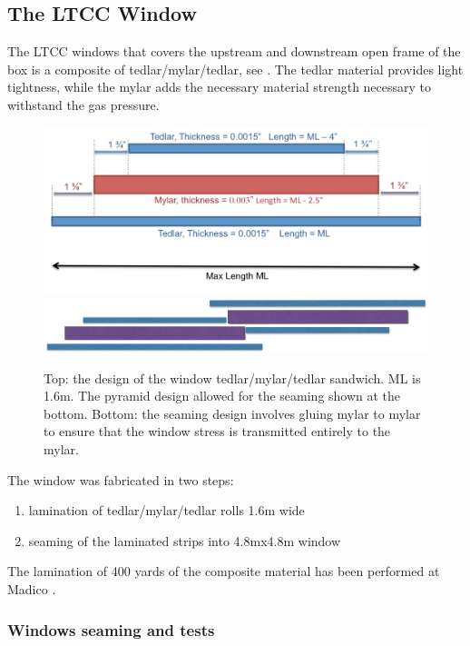 \subsection{The LTCC Window}

The LTCC windows that covers the upstream and downstream open frame of the box is a composite of tedlar/mylar/tedlar, see . The tedlar
material provides light tightness, while the mylar adds the necessary material strength necessary to withstand the gas pressure.

\begin{figure}
	\centering
	\includegraphics[width=1.0\columnwidth,keepaspectratio]{img/windowDesign.png}
	\includegraphics[width=1.0\columnwidth,keepaspectratio]{img/windowSeaming.png}
\caption{Top: the design of the window tedlar/mylar/tedlar sandwich. ML is 1.6m. The pyramid design allowed for the seaming shown at the bottom.
			Bottom: the seaming design involves gluing mylar to mylar to ensure that the window stress is transmitted entirely to the mylar. }
	\label{fig:windowDesign}
\end{figure}


The window was fabricated in two steps:

\begin{enumerate}
	\item lamination of tedlar/mylar/tedlar rolls 1.6m  wide
	\item seaming of the laminated strips into 4.8mx4.8m window
\end{enumerate}

The lamination of 400 yards of the composite material has been performed at Madico \cite{madico}.

\subsubsection{Windows seaming and tests}

